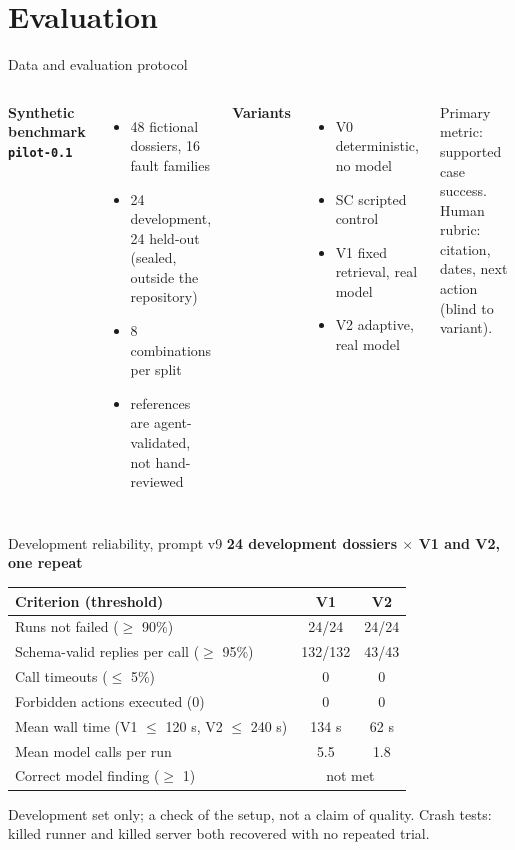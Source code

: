 \documentclass[aspectratio=169,10pt]{beamer}
\newcommand{\code}[1]{\texttt{\small #1}}
\begin{document}
\section{Evaluation}
\begin{frame}{Data and evaluation protocol}
\begin{columns}[T]
\textbf{Synthetic benchmark \code{pilot-0.1}}
\begin{itemize}
\item 48 fictional dossiers, 16 fault families
\item 24 development, 24 held-out (sealed, outside the repository)
\item 8 combinations per split
\item references are agent-validated, not hand-reviewed
\end{itemize}
\textbf{Variants}
\begin{itemize}
\item V0 deterministic, no model
\item SC scripted control
\item V1 fixed retrieval, real model
\item V2 adaptive, real model
\end{itemize}
Primary metric: supported case success. Human rubric: citation, dates, next action (blind to variant).
\end{columns}
\end{frame}

\begin{frame}{Development reliability, prompt v9}
\small
\textbf{24 development dossiers $\times$ V1 and V2, one repeat}\par\smallskip
\begin{tabularx}{\linewidth}{@{}X c c@{}}
\toprule
\textbf{Criterion (threshold)} & \textbf{V1} & \textbf{V2} \\ \midrule
Runs not failed ($\ge$ 90\%) & 24/24 & 24/24 \\
Schema-valid replies per call ($\ge$ 95\%) & 132/132 & 43/43 \\
Call timeouts ($\le$ 5\%) & 0 & 0 \\
Forbidden actions executed (0) & 0 & 0 \\
Mean wall time (V1 $\le$ 120 s, V2 $\le$ 240 s) & \textcolor{humanred}{134 s} & 62 s \\
Mean model calls per run & 5.5 & 1.8 \\
Correct model finding ($\ge$ 1) & \multicolumn{2}{c}{\textcolor{humanred}{not met}} \\
\bottomrule
\end{tabularx}

\vspace{4pt}\footnotesize Development set only; a check of the setup, not a claim of quality. Crash tests: killed runner and killed server both recovered with no repeated trial.
\end{frame}
\end{document}

